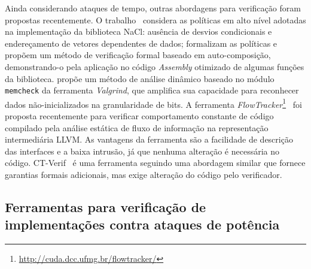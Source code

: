 \documentclass{SBCbookchapter}
\begin{document}
Ainda considerando ataques de tempo, outras abordagens para verificação foram propostas recentemente. O trabalho~\cite{AlmeidaBPV13} considera as políticas em alto nível adotadas na implementação da biblioteca NaCl:
ausência de desvios condicionais e endereçamento de vetores dependentes de dados;
formalizam as políticas e propõem um método de verificação formal baseado em auto-composição,
demonstrando-o pela aplicação no código \emph{Assembly} otimizado de algumas funções da biblioteca.
\cite{Langley12} propõe um método de análise dinâmico baseado no módulo \texttt{memcheck} da ferramenta \emph{Valgrind}, que amplifica sua capacidade para
reconhecer dados não-inicializados na granularidade de {bits}. A ferramenta \emph{FlowTracker}\footnote{\url{http://cuda.dcc.ufmg.br/flowtracker/}}~\cite{RodriguesPA16} foi proposta recentemente para verificar comportamento constante de código compilado pela análise estática de fluxo de informação na representação intermediária LLVM. As vantagens da ferramenta são a facilidade de descrição das interfaces e a baixa intrusão, já que nenhuma alteração é necessária no código. CT-Verif~\cite{AlmeidaBBDE16} é uma ferramenta seguindo uma abordagem similar que fornece garantias formais adicionais, mas exige alteração do código pelo verificador.

\subsection{Ferramentas para verificação de implementações contra ataques de potência}



\end{document}
